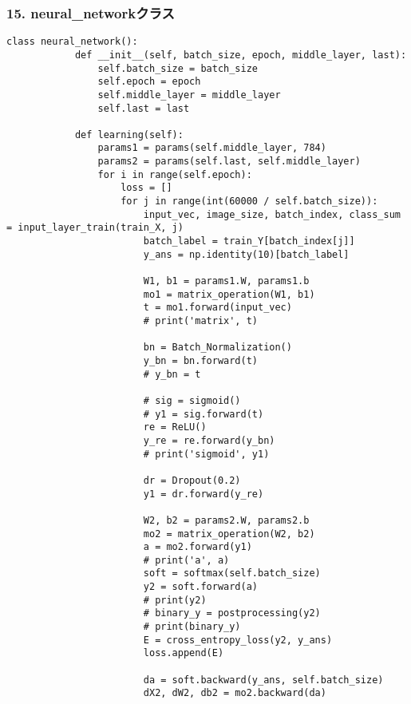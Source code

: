 \documentclass[a4j, titlepage]{jarticle}
\begin{document}
    \subsubsection*{15. neural\_networkクラス}
        \begin{lstlisting}[caption=3層ニューラルネットワークの構成 ,label=fuga]
        class neural_network():
            def __init__(self, batch_size, epoch, middle_layer, last):
                self.batch_size = batch_size
                self.epoch = epoch
                self.middle_layer = middle_layer
                self.last = last

            def learning(self):
                params1 = params(self.middle_layer, 784)
                params2 = params(self.last, self.middle_layer)
                for i in range(self.epoch):
                    loss = []
                    for j in range(int(60000 / self.batch_size)):
                        input_vec, image_size, batch_index, class_sum = input_layer_train(train_X, j)
                        batch_label = train_Y[batch_index[j]]
                        y_ans = np.identity(10)[batch_label]

                        W1, b1 = params1.W, params1.b
                        mo1 = matrix_operation(W1, b1)
                        t = mo1.forward(input_vec)
                        # print('matrix', t)

                        bn = Batch_Normalization()
                        y_bn = bn.forward(t)
                        # y_bn = t

                        # sig = sigmoid()
                        # y1 = sig.forward(t)
                        re = ReLU()
                        y_re = re.forward(y_bn)
                        # print('sigmoid', y1)

                        dr = Dropout(0.2)
                        y1 = dr.forward(y_re)

                        W2, b2 = params2.W, params2.b
                        mo2 = matrix_operation(W2, b2)
                        a = mo2.forward(y1)
                        # print('a', a)
                        soft = softmax(self.batch_size)
                        y2 = soft.forward(a)
                        # print(y2)
                        # binary_y = postprocessing(y2)
                        # print(binary_y)
                        E = cross_entropy_loss(y2, y_ans)
                        loss.append(E)

                        da = soft.backward(y_ans, self.batch_size)
                        dX2, dW2, db2 = mo2.backward(da)


\end{lstlisting}
\end{document}

